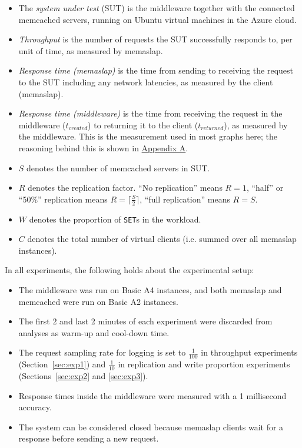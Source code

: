 \documentclass[11pt]{article}
\newcommand{\set}[0]{\texttt{SET}}
\begin{document}
\begin{itemize}
\item The \emph{system under test} (SUT) is the middleware together with the connected memcached servers, running on Ubuntu virtual machines in the Azure cloud.
\item \emph{Throughput} is the number of requests the SUT successfully responds to, per unit of time, as measured by memaslap.
\item \emph{Response time (memaslap)} is the time from sending to receiving the request to the SUT including any network latencies, as measured by the client (memaslap).
\item \emph{Response time (middleware)} is the time from receiving the request in the middleware ($t_{created}$) to returning it to the client ($t_{returned}$), as measured by the middleware. This is the measurement used in most graphs here; the reasoning behind this is shown in \hyperref[sec:appa]{Appendix A}.
\item $S$ denotes the number of memcached servers in SUT.
\item $R$ denotes the replication factor. ``No replication'' means $R=1$, ``half'' or ``50\%'' replication means $R=\lceil\frac{S}{2}\rceil$, ``full replication'' means $R=S$.
\item $W$ denotes the proportion of \set{}s in the workload.
\item $C$ denotes the total number of virtual clients (i.e. summed over all memaslap instances).
\end{itemize}
\vspace{1mm}
In all experiments, the following holds about the experimental setup:
\begin{itemize}
\item The middleware was run on Basic A4 instances, and both memaslap and memcached were run on Basic A2 instances.
\item The first 2 and last 2 minutes of each experiment were discarded from analyses as warm-up and cool-down time.
\item The request sampling rate for logging is set to $\frac{1}{100}$ in throughput experiments (Section~\ref{sec:exp1}) and $\frac{1}{10}$ in replication and write proportion experiments (Sections~\ref{sec:exp2} and \ref{sec:exp3}).
\item Response times inside the middleware were measured with a 1 millisecond accuracy.
\item The system can be considered closed because memaslap clients wait for a response before sending a new request.
\end{itemize}
\end{document}
